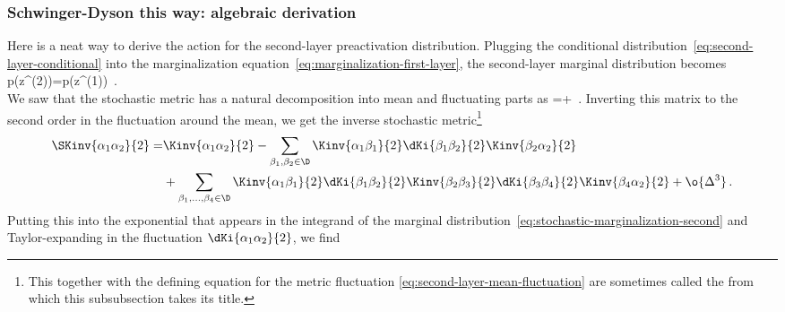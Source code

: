 \subsubsection{Schwinger-Dyson this way: algebraic derivation}
Here is a neat way to derive the action for the second-layer preactivation distribution. Plugging the conditional distribution~\eqref{eq:second-layer-conditional} into the marginalization equation~\eqref{eq:marginalization-first-layer}, the second-layer marginal distribution becomes
\be\label{eq:stochastic-marginalization-second}
p\!\le(z^{(2)}\Big\vert\D\ri)=\int {} p\!\le(z^{(1)}\Big\vert\D\ri)\, .\\
\ee
We saw that the stochastic metric has a natural decomposition into mean and fluctuating parts as
\be
{}=+\, .
\ee
Inverting this matrix to the second order in the fluctuation around the mean, we get the inverse stochastic metric\footnote{This together with the defining equation for the metric fluctuation \eqref{eq:second-layer-mean-fluctuation} are sometimes called the  \cite{DysonEq,Schwinger452} from which this subsubsection takes its title.}
\begin{align}\label{eq:stochastic-metric-inversion}
\SKinv{\alpha_1\alpha_2}{2}=&\Kinv{\alpha_1\alpha_2}{2}-\sum_{\beta_1,\beta_{2}\in\D}\Kinv{\alpha_1\beta_1}{2}\dKi{\beta_1\beta_2}{2}\Kinv{\beta_2\alpha_2}{2}\, \\
&+\sum_{\beta_1,\ldots,\beta_{4}\in\D}\Kinv{\alpha_1\beta_1}{2}\dKi{\beta_1\beta_2}{2}\Kinv{\beta_2\beta_3}{2} \dKi{\beta_{3}\beta_{4}}{2} \Kinv{\beta_{4}\alpha_2}{2}+\o{\Delta^3}\, .\nonumber
\end{align}
Putting this into the exponential that appears in the integrand of the marginal distribution~\eqref{eq:stochastic-marginalization-second} and Taylor-expanding in the fluctuation $\dKi{\alpha_1\alpha_2}{2}$, we find
